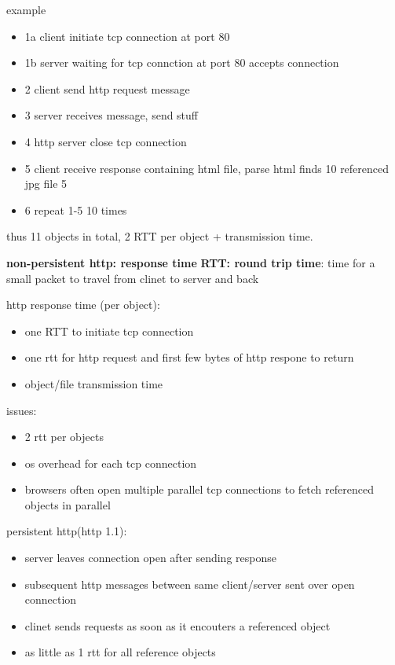 \documentclass[10pt]{article}
\theoremstyle{break}
\begin{document}
example 
\begin{itemize}
    \item 1a client initiate tcp connection at port 80 
    \item 1b server waiting for tcp connction at port 80 accepts connection 
    \item 2 client send http request message 
    \item 3 server receives message, send stuff 
    \item 4 http server close tcp connection 
    \item 5 client receive response containing html file, parse html finds 10 referenced jpg file 5 
    \item 6 repeat 1-5 10 times
\end{itemize}
thus 11 objects in total, 2 RTT per object + transmission time. 


\textbf{non-persistent http: response time}
\textbf{RTT: round trip time}: time for a small packet to travel from clinet to server and back 

http response time (per object):
\begin{itemize}
    \item one RTT to initiate tcp connection 
    \item one rtt for http request and first few bytes of http respone to return 
    \item object/file transmission time
\end{itemize}

issues: 
\begin{itemize}
    \item 2 rtt per objects 
    \item os overhead for each tcp connection 
    \item browsers often open multiple parallel tcp connections to fetch referenced objects in parallel
\end{itemize}

persistent http(http 1.1):
\begin{itemize}
    \item server leaves connection open after sending response 
    \item subsequent http messages between same client/server sent over open connection 
    \item clinet sends requests as soon as it encouters a referenced object 
    \item as little as 1 rtt for all reference objects
\end{itemize}
\end{document}
